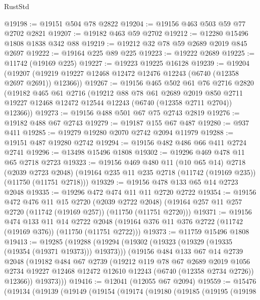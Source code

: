 \begin{lexlean}{RustStd}
\begin{coremodule}
@19198 := @19151 @504 @78 @2822
@19204 := @19156 @463 @503 @59 @77 @2702 @2821
@19207 := @19182 @463 @59 @2702
@19212 := @12280 @15496 @1808 @1838 @342 @88
@19219 := @19212 @32 @78 @59 @2689 @2019 @845 @2697
@19222 := @19164 @225 @89 @225
@19223 := @19222 @2689
@19225 := @11742 (@19169 @225)
@19227 := @19223 @19225 @16128
@19239 := @19204
    (@19207 (@19219 @19227 @12468 @12472 @12476 @12243 (@6740 (@12358 @2697 @2691)) @12366))
@19267 := @19156
    @465
    @502
    @61
    @76
    @2716
    @2820
    (@19182
      @465
      @61
      @2716
      (@19212
        @88
        @78
        @61
        @2689
        @2019
        @850
        @2711
        @19227
        @12468
        @12472
        @12544
        @12243
        (@6740 (@12358 @2711 @2704))
        @12366))
@19273 := @19156 @488 @501 @67 @75 @2743 @2819
@19276 := @19182 @488 @67 @2743
@19279 := @19187 @155 @67 @487
@19280 := @937 @411
@19285 := @19279 @19280 @2070 @2742 @2094 @11979
@19288 := @19151 @487 @19280 @2742
@19294 := @19156 @482 @486 @66 @411 @2724 @2741
@19296 := @13498 @15496 @1808
@19302 := @19296 @469 @478 @11 @65 @2718 @2723
@19323 := @19156
    @469
    @480
    @11
    (@10 @65 @14)
    @2718
    (@2039 @2723 @2048)
    (@19164 @235 @11 @235 @2718 (@11742 (@19169 @235)) (@11750 (@11751 @2718)))
@19329 := @19156 @478 @133 @65 @14 @2723 @2048
@19335 := @19296 @472 @474 @11 @11 @2720 @2722
@19354 := @19156
    @472
    @476
    @11
    @15
    @2720
    (@2039 @2722 @2048)
    (@19164 @257 @11 @257 @2720 (@11742 (@19169 @257)) (@11750 (@11751 @2720)))
@19371 := @19156
    @474
    @133
    @11
    @14
    @2722
    @2048
    (@19164 @376 @11 @376 @2722 (@11742 (@19169 @376)) (@11750 (@11751 @2722)))
@19373 := @11759 @15496 @1808
@19413 := @19285
    (@19288
      (@19294
        (@19302 (@19323 (@19329 (@19335 (@19354 (@19371 @19373))) @19373)))
        (@19156
          @484
          @133
          @67
          @14
          @2739
          @2048
          (@19182
            @484
            @67
            @2739
            (@19212
              @119
              @78
              @67
              @2689
              @2019
              @1056
              @2734
              @19227
              @12468
              @12472
              @12610
              @12243
              (@6740 (@12358 @2734 @2726))
              @12366))
          @19373)))
@19416 := @12041 (@12055 @67 @2094)
@19559 := @15476
    (@19134
      (@19139
        (@19149
          (@19154
            (@19174
              (@19180
                (@19185
                  (@19195
                    (@19198

\end{coremodule}
\end{lexlean}

